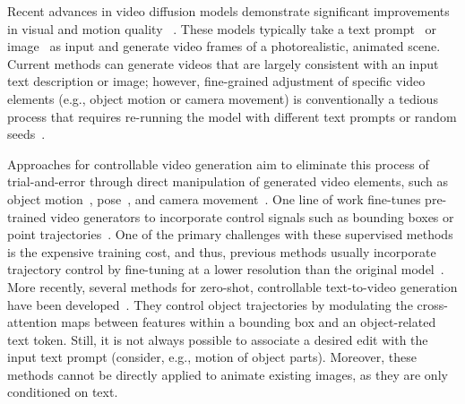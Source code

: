 \documentclass{article} \usepackage{iclr2025_conference,times}
\begin{document}
Recent advances in video diffusion models demonstrate significant improvements in visual and motion quality ~\citep{VideoDiffusionModels,blattmann2023stable,AlignYourLatents,LVDM}. 
These models typically take a text prompt~\citep{VideoDiffusionModels,blattmann2023stable,ImagenVideo} or image~\citep{VideoCrafter1,VideoCrafter2,AnimateDiff,DynamiCrafter} as input and generate video frames of a photorealistic, animated scene.
Current methods can generate videos that are largely consistent with an input text description or image; however, fine-grained adjustment of specific video elements (e.g., object motion or camera movement) is conventionally a tedious process that requires re-running the model with different text prompts or random seeds~\citep{wu2023freeinit,qiu2024freetraj}.

Approaches for controllable video generation aim to eliminate this process of trial-and-error through direct manipulation of generated video elements, such as object motion~\citep{wu2024draganything,yin2023dragnuwa,wang2024boximator}, pose~\citep{AnimateAnyone,MagicAnimate}, and camera movement~\citep{MotionCtrl,li2024image,CameraCtrl,MotionMaster}.
One line of work fine-tunes pre-trained video generators to incorporate control signals such as bounding boxes or point trajectories~\citep{wu2024draganything,MotionCtrl}. 
One of the primary challenges with these supervised methods is the expensive training cost, and thus, previous methods usually incorporate trajectory control by fine-tuning at a lower resolution than the original model~\cite{wu2024draganything, yin2023dragnuwa}.
More recently, several methods for zero-shot, controllable text-to-video generation have been developed~\citep{ma2023trailblazer,qiu2024freetraj,jain2024peekaboo}.
They control object trajectories by modulating the cross-attention maps between features within a bounding box and an object-related text token.
Still, it is not always possible to associate a desired edit with the input text prompt (consider, e.g., motion of object parts). 
Moreover, these methods cannot be directly applied to animate existing images, as they are only conditioned on text.
\end{document}
